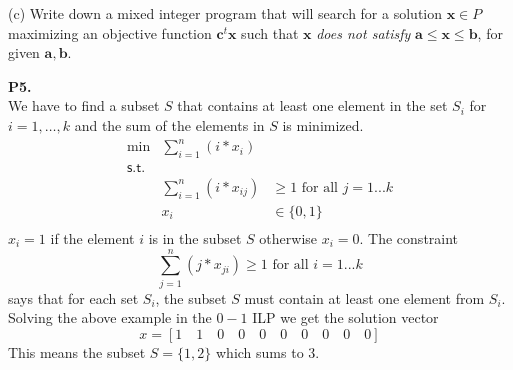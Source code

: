 \documentclass[11pt]{article}
\begin{document}
\noindent (c) Write down a mixed integer program that will search for a solution
$\mathbf{x} \in P$ maximizing an objective function $\mathbf{c}^t \mathbf{x}$ 
such that $\mathbf{x}$ \emph{does not satisfy}
$\mathbf{a} \leq \mathbf{x} \leq \mathbf{b}$, for given $\mathbf{a}, \mathbf{b}$.

\medskip

\noindent\textbf{P5.}
\\
We have to find a subset $S$ that contains at least one element in the set $S_i$ for $i = 1,\ldots, k$ and the sum of the elements in $S$ is minimized.
\[\begin{array}{rlllllllll}
\min & \sum_{i=1}^{n} (i*x_i) \\
\mathsf{s.t. } \\
& \sum_{i=1}^{n} (i*x_{ij}) & \geq 1 \text{ for all }j = 1...k\\
& x_i & \in \{0,1\} \\
\end{array}\]
$x_i = 1$ if the element $i$ is in the subset $S$ otherwise $x_i = 0$.  The constraint 
$$
\sum_{j=1}^{n} (j*x_{ji}) \geq 1 \text{ for all }i = 1...k
$$
says that for each set $S_i$, the subset $S$ must contain at least one element from $S_i$.  Solving the above example in the $0-1$ ILP we get the solution vector 
$$
x = [1\quad1\quad0\quad0\quad0\quad0\quad0\quad0\quad0\quad0]
$$ 
This means the subset $S = \{1, 2\}$ which sums to 3.
\end{document}
